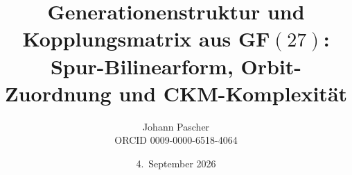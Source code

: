 \documentclass[11pt,a4paper]{report}
\title{Generationenstruktur und Kopplungsmatrix aus GF$(27)$:\\[0.5em]
  \large Spur-Bilinearform, Orbit-Zuordnung und CKM-Komplexität}
\date{4.~September 2026}
\author{Johann Pascher\\\small ORCID 0009-0000-6518-4064}
\begin{document}
\renewcommand{\thechapter}{}
\renewcommand{\thesection}{\arabic{section}}
\maketitle
\tableofcontents

\end{document}
